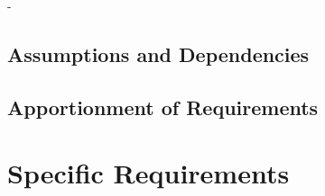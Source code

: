 -\documentclass[compsoc,draftclsnofoot,onecolumn,10pt]{IEEEtran}
\begin{document}
\subsection{Assumptions and Dependencies}

\subsection{Apportionment of Requirements} %



\section{Specific Requirements} %
%
\end{document}
